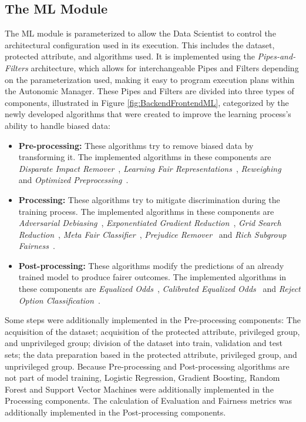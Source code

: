 \documentclass[sigconf]{acmart}
\begin{document}
\subsection{The ML Module}

The ML module is parameterized to allow the Data Scientist to control the architectural configuration used in its execution. This includes the dataset, protected attribute, and algorithms used. It is implemented using the \textit{Pipes-and-Filters} architecture, which allows for interchangeable Pipes and Filters depending on the parameterization used, making it easy to program execution plans within the Autonomic Manager. These Pipes and Filters are divided into three types of components, illustrated in Figure \ref{fig:BackendFrontendML}, categorized by the newly developed algorithms that were created to improve the learning process's ability to handle biased data: 

\begin{itemize}
\item \textbf{Pre-processing:} These algorithms try to remove biased data by transforming it. The implemented algorithms in these components are \textit{Disparate Impact Remover}~\citep{Feldman_2015}, \textit{Learning Fair Representations}~\citep{Zemel_2013}, \textit{Reweighing}~\citep{Kamiran_2011} and \textit{Optimized Preprocessing}~\citep{Calmon_2017}.
\item \textbf{Processing:} These algorithms try to mitigate discrimination during the training process. The implemented algorithms in these components are \textit{Adversarial Debiasing}~\citep{Zhang_2018}, \textit{Exponentiated Gradient Reduction}~\citep{Agarwal_2018}, \textit{Grid Search Reduction}~\citep{Agarwal_2019}, \textit{Meta Fair Classifier}~\citep{Celis_2019}, \textit{Prejudice Remover}~\citep{Kamishima_2012} and \textit{Rich Subgroup Fairness}~\citep{Kearns_2018}.
\item \textbf{Post-processing:} These algorithms modify the predictions of an already trained model to produce fairer outcomes. The implemented algorithms in these components are \textit{Equalized Odds}~\citep{Hardt_2016}, \textit{Calibrated Equalized Odds}~\citep{Pleiss_2017} and \textit{Reject Option Classification}~\citep{Kamiran_2012}.
\end{itemize}

Some steps were additionally implemented in the Pre-processing components: The acquisition of the dataset; acquisition of the protected attribute, privileged group, and unprivileged group; division of the dataset into train, validation and test sets; the data preparation based in the protected attribute, privileged group, and unprivileged group. Because Pre-processing and Post-processing algorithms are not part of model training, Logistic Regression, Gradient Boosting, Random Forest and Support Vector Machines were additionally implemented in the Processing components. The calculation of Evaluation and Fairness metrics was additionally implemented in the Post-processing components.
\end{document}
